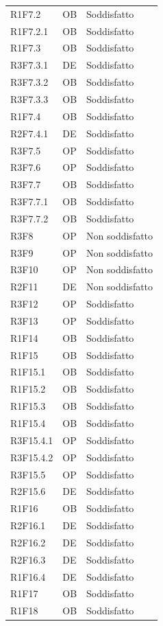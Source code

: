 {\begin{longtable}{C{2.5cm} C{2cm} C{3.5cm}}
R1F7.2 & OB & Soddisfatto\\
R1F7.2.1 & OB & Soddisfatto\\
R1F7.3 & OB & Soddisfatto\\
R3F7.3.1 & DE & Soddisfatto\\
R3F7.3.2 & OB & Soddisfatto\\
R3F7.3.3 & OB & Soddisfatto\\
R1F7.4 &  OB & Soddisfatto\\
R2F7.4.1 & DE & Soddisfatto\\
R3F7.5 & OP & Soddisfatto\\
R3F7.6 & OP & Soddisfatto\\
R3F7.7 & OB & Soddisfatto\\
R3F7.7.1 & OB & Soddisfatto\\
R3F7.7.2 & OB & Soddisfatto\\
R3F8 & OP & Non soddisfatto\\
R3F9 & OP & Non soddisfatto\\
R3F10 & OP & Non soddisfatto\\
R2F11 & DE & Non soddisfatto\\
R3F12 & OP & Soddisfatto\\
R3F13 & OP & Soddisfatto\\
R1F14 & OB & Soddisfatto\\
R1F15 & OB & Soddisfatto\\
R1F15.1 & OB & Soddisfatto\\
R1F15.2 & OB & Soddisfatto\\
R1F15.3 & OB & Soddisfatto\\
R1F15.4 & OB & Soddisfatto\\
R3F15.4.1 & OP & Soddisfatto\\
R3F15.4.2 & OP & Soddisfatto\\
R3F15.5 & OP & Soddisfatto\\
R2F15.6 & DE & Soddisfatto\\
R1F16 & OB & Soddisfatto\\ 
R2F16.1 & DE & Soddisfatto\\
R2F16.2 & DE & Soddisfatto\\
R2F16.3 & DE & Soddisfatto\\
R1F16.4 & DE & Soddisfatto \\
R1F17 & OB & Soddisfatto\\
R1F18 & OB & Soddisfatto\\

\end{longtable}
}	
\newpage
